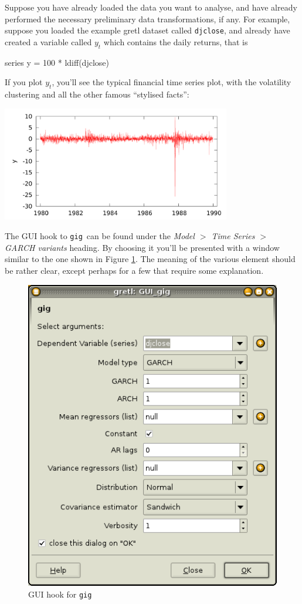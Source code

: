 \documentclass[a4paper,11pt]{article}
\newcommand{\app}[1]{\textsf{#1}}
\newcommand{\gig}{\texttt{gig}}
\begin{document}
Suppose you have already loaded the data you want to analyse, and have
already performed the necessary preliminary data transformations, if
any. For example, suppose you loaded the example \app{gretl} dataset
called \texttt{djclose}, and already have created a variable called
$y_t$ which contains the daily returns, that is 
\begin{code}
  series y = 100 * ldiff(djclose)
\end{code}
If you plot $y_t$, you'll see the typical financial time series plot,
with the volatility clustering and all the other famous ``stylised
facts'':
\begin{center}
  \includegraphics[width=0.75\textwidth,height=0.35\textwidth]{graphs/djret}
\end{center}

The GUI hook to \gig\ can be found under the \emph{Model $>$ Time
  Series $>$ GARCH variants} heading. By choosing it you'll be
presented with a window similar to the one shown in Figure
\ref{fig:GUI-gig}. The meaning of the various element should be rather
clear, except perhaps for a few that require some explanation.

\begin{figure}[htb]
  \centering
  \includegraphics[scale=0.45]{graphs/GUI-gig}
  \caption{GUI hook for \gig}
  \label{fig:GUI-gig}
\end{figure}
\end{document}

